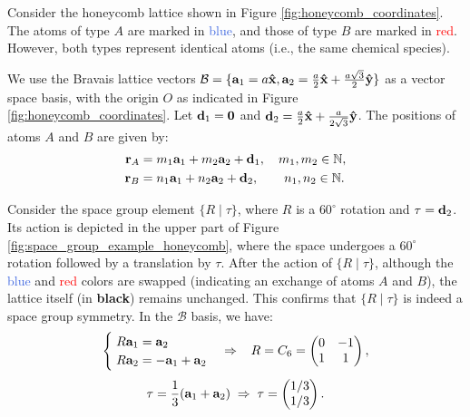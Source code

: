 \begin{example} \label{ex:symmorphic_example_graphene}
Consider the honeycomb lattice shown in Figure \ref{fig:honeycomb_coordinates}. The atoms of type \(A\) are marked in \textcolor{RoyalBlue}{blue}, and those of type \(B\) are marked in \textcolor{red}{red}. However, both types represent identical atoms (i.e., the same chemical species).

We use the Bravais lattice vectors \(\mathcal{B} = \{\vb{a}_1 = a \vu{x}, \vb{a}_2 = \frac{a}{2} \vu{x} + \frac{a\sqrt{3}}{2} \vu{y}\}\) as a vector space basis, with the origin \(O\) as indicated in Figure \ref{fig:honeycomb_coordinates}. Let \(\vb{d}_1 = {\vb{0}}\) and \(\vb{d}_2 = \frac{a}{2} \vu{x} + \frac{a}{2\sqrt{3}} \vu{y}\). The positions of atoms \(A\) and \(B\) are given by:
\begin{align} \label{eq:positions_atom_AB}
&& {\vb{r}}_A &= m_1 \vb{a}_1 + m_2 \vb{a}_2 + \vb{d}_1, \quad m_1, m_2 \in {\mathbb{N}} , & \\
&& {\vb{r}}_B &= n_1 \vb{a}_1 + n_2 \vb{a}_2 + \vb{d}_2, \quad \quad n_1, n_2 \in {\mathbb{N}} . &
\end{align}

Consider the space group element \(\{R \mid \tau\}\), where \(R\) is a \(60^\circ\) rotation and \(\tau = \vb{d}_2\). Its action is depicted in the upper part of Figure \ref{fig:space_group_example_honeycomb}, where the space undergoes a \(60^\circ\) rotation followed by a translation by \(\tau\). After the action of \(\{R \mid \tau\}\), although the \textcolor{RoyalBlue}{blue} and \textcolor{red}{red} colors are swapped (indicating an exchange of atoms \(A\) and \(B\)), the lattice itself (in \textbf{black}) remains unchanged. This confirms that \(\{R \mid \tau\}\) is indeed a space group symmetry. In the \(\mathcal{B}\) basis, we have:
\begin{equation} \label{eq:rotation_matrix_C6_space_group_example}
\begin{cases}
\; R \vb{a}_1 = \vb{a}_2 \\
\; R \vb{a}_2 = -\vb{a}_1 + \vb{a}_2
\end{cases}
\Rightarrow \;\;\;
R = C_6 =
\begin{pmatrix}
0 & -1 \\
1 &  1
\end{pmatrix},
\end{equation}
\begin{equation} \label{eq:tau_translation_C6_space_group_example}
\tau = \frac{1}{3} (\vb{a}_1 + \vb{a}_2) \; \Rightarrow \;
\tau =
\begin{pmatrix}
1/3 \\ 1/3
\end{pmatrix}.
\end{equation}


\end{example}
